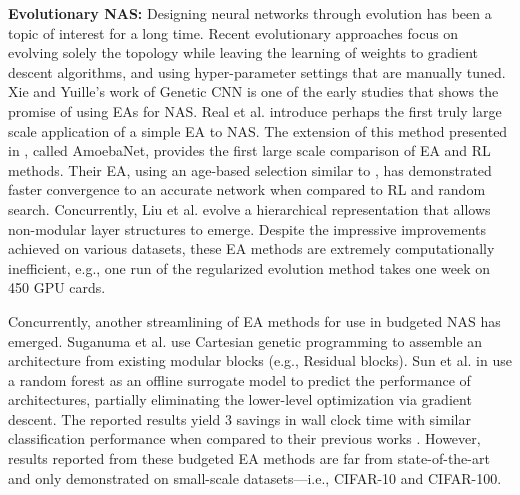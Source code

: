\documentclass[journal]{IEEEtran}
\theoremstyle{definition}
\theoremstyle{remark}
\begin{document}
\vspace{3pt}
\noindent\textbf{Evolutionary NAS:} Designing neural networks through evolution has been a topic of interest for a long time. Recent evolutionary approaches focus on evolving solely the topology while leaving the learning of weights to gradient descent algorithms, and using hyper-parameter settings that are manually tuned. Xie and Yuille's work of Genetic CNN \cite{genetic-cnn} is one of the early studies that shows the promise of using EAs for NAS. Real et al. \cite{real2017largescale} introduce perhaps the first truly large scale application of a simple EA to NAS. The extension of this method presented in \cite{real2019regularized}, called AmoebaNet, provides the first large scale comparison of EA and RL methods. Their EA, using an age-based selection similar to \cite{alphs}, has demonstrated faster convergence to an accurate network when compared to RL and random search. Concurrently, Liu et al. \cite{liu2018hierarchical} evolve a hierarchical representation that allows non-modular layer structures to emerge. Despite the impressive improvements achieved on various datasets, these EA methods are extremely computationally inefficient, e.g., one run of the regularized evolution method \cite{real2019regularized} takes one week on 450 GPU cards.

Concurrently, another streamlining of EA methods for use in budgeted NAS has emerged. Suganuma et al. \cite{cgp-cnn} use Cartesian genetic programming to assemble an architecture from existing modular blocks (e.g., Residual blocks). Sun et al. in \cite{ae-cnn-e2epp} use a random forest as an offline surrogate model to predict the performance of architectures, partially eliminating the lower-level optimization via gradient descent. The reported results yield 3 savings in wall clock time with similar classification performance when compared to their previous works \cite{ae-cnn,cnn-ga}. However, results reported from these budgeted EA methods are far from state-of-the-art and only demonstrated on small-scale datasets---i.e., CIFAR-10 and CIFAR-100.
\end{document}
